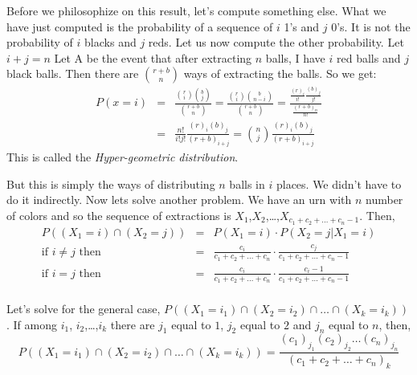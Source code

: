 Before we philosophize on this result, let's compute something else.
What we have just computed is the probability of a sequence of 
$i$ 1's and $j$ 0's. It is not the probability of $i$ blacks and $j$ reds.
Let us now compute the other probability. Let $i+j=n$
Let A be the event that after extracting $n$ balls, I have $i$ red
balls and $j$ black balls. Then there are ${{r+b}\choose {n}}$ ways of
extracting the balls. So we get:
\begin{eqnarray*}
P(x=i) &=& \frac{{{r}\choose{i}} {{b}\choose{j}}}{{{r+b}\choose{n}}}=
\frac{{{r}\choose{i}} {{b}\choose{n-i}}}{{{r+b}\choose{n}}}
=\frac{\frac{(r)_i}{i!} \frac{(b)_j}{j!}}{\frac{(r+b)_n}{n!}}\\
&=& \frac{n!}{i! j!} \frac{(r)_i (b)_j}{(r+b)_{i+j}}=
{{n}\choose{j}} \frac{(r)_i (b)_j}{(r+b)_{i+j}}
\end{eqnarray*}
This is called the {\it Hyper-geometric distribution}.

But this is simply the ways of distributing $n$ balls in $i$ places.
We didn't have to do it indirectly.
Now lets solve another problem. 
We have an urn with $n$ number of colors and so the sequence of 
extractions is $X_1$,$X_2$,\ldots,$X_{c_1+c_2+\ldots+c_n-1}$. Then,
\begin{eqnarray*}
P((X_1=i) \cap (X_2=j)) &=& P(X_1=i) \cdot P(X_2=j|X_1=i)\\ 
\mbox{if } i\not=j \mbox{ then} &=& \frac{c_i}{c_1+c_2+\ldots+c_n} \cdot
\frac{c_j}{c_1+c_2+\ldots+c_n-1}\\
\mbox{if } i=j \mbox{ then} &=& \frac{c_i}{c_1+c_2+\ldots+c_n} \cdot
\frac{c_i-1}{c_1+c_2+\ldots+c_n-1}\\ 
\end{eqnarray*}

Let's solve for the general case, $P((X_1=i_1) \cap (X_2=i_2) \cap \ldots
\cap (X_k=i_k))$.  If among $i_1$, $i_2$,\ldots,$i_k$ there are $j_1$
equal to $1$, $j_2$ equal to $2$ and $j_n$ equal to $n$, then,  
\begin{equation}
P((X_1=i_1) \cap (X_2=i_2) \cap \ldots \cap (X_k=i_k))=
\frac{(c_1)_{j_1} (c_2)_{j_2} \ldots
(c_n)_{j_n}}{(c_1+c_2+\ldots+c_n)_{k}}
\end{equation}

